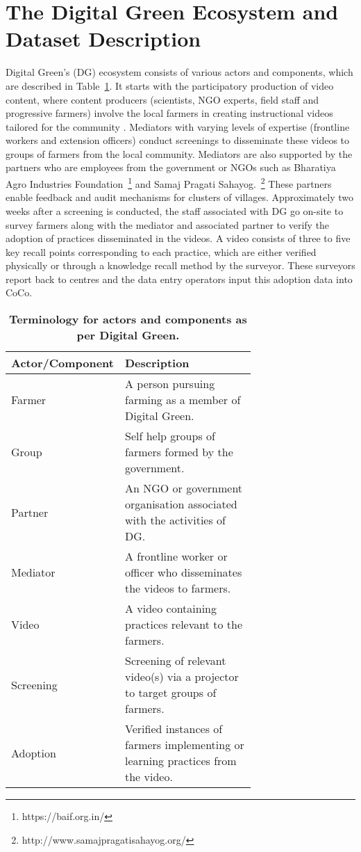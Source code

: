 \documentclass[manuscript,screen]{acmart}
\begin{document}
\section{The Digital Green Ecosystem and Dataset Description} \label{ecosystem_dataset}

Digital Green's (DG) ecosystem consists of various actors and components, which are described in Table~\ref{tab:terminology_actors_attributes}. It starts with the participatory production of video content, where content producers (scientists, NGO experts, field staff and progressive farmers) involve the local farmers in creating instructional videos tailored for the community \cite{Gandhi}. Mediators with varying levels of expertise (frontline workers and extension officers) conduct screenings to disseminate these videos to groups of farmers from the local community. Mediators are also supported by the partners who are employees from the government or NGOs such as Bharatiya Agro Industries Foundation~\footnote{https://baif.org.in/} and Samaj Pragati Sahayog.~\footnote{http://www.samajpragatisahayog.org/} These partners enable feedback and audit mechanisms for clusters of villages. Approximately two weeks after a screening is conducted, the staff associated with DG go on-site to survey farmers along with the mediator and associated partner to verify the adoption of practices disseminated in the videos. A video consists of three to five key recall points corresponding to each practice, which are either verified physically or through a knowledge recall method by the surveyor. These surveyors report back to centres and the data entry operators input this adoption data into CoCo. 

\begin{table}[!h]
  \caption{\textbf{Terminology for actors and components as per Digital Green.}}
  \label{tab:terminology_actors_attributes}
  \begin{tabular}{lp{0.7\linewidth}}
    \toprule
    Actor/Component & Description\\
    \midrule
    Farmer & A person pursuing farming as a member of Digital Green.\\
    Group & Self help groups of farmers formed by the government.\\
    Partner & An NGO or government organisation associated with the activities of DG.\\
    Mediator & A frontline worker or officer who disseminates the videos to farmers.\\
    Video & A video containing practices relevant to the farmers.\\
    Screening & Screening of relevant video(s) via a projector to target groups of farmers.\\
    Adoption & Verified instances of farmers implementing or learning practices from the video.\\
  \bottomrule
\end{tabular}
\end{table}
\end{document}
